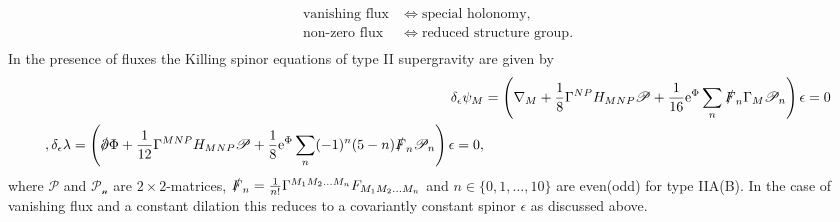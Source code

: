 \begin{equation*}
    \begin{aligned}
    \text{vanishing flux}&\Longleftrightarrow \text{special holonomy},\\
    \text{non-zero flux}&\Longleftrightarrow \text{reduced structure group}.\\
    \end{aligned}
\end{equation*}
In the presence of fluxes the Killing spinor equations of type II supergravity are given by \cite{Blumenhagen2013}
\begin{equation}\label{eq:KillingSpinorWithFluxGravitino}
\begin{aligned}
    \delta_\epsilon \psi_M &= \left(\nabla_M+\frac{1}{8}\Gamma^{NP}H_{MNP}\mathscr{P}+\frac{1}{16}\ee^\Phi\sum_{n}\slashed{F}_n\Gamma_M\mathscr{P}_n\right)\epsilon=0\\,

    \delta_\epsilon \lambda = \left(\slashed{\pd}\Phi+\frac{1}{12}\Gamma^{MNP}H_{MNP}\mathscr{P}+\frac{1}{8}\ee^\Phi\sum_{n}(-1)^n(5-n)\slashed{F}_n\mathscr{P}_n\right)\epsilon=0,
    \end{aligned}
\end{equation}
where $\mathscr{P}$ and $\mathscr{P_n}$ are $2\times 2$-matrices, $\slashed{F}_n=\frac{1}{n!}\Gamma^{M_1M_2\ldots M_n}F_{M_1M_2\ldots M_n}$ and $n\in\{0,1,\ldots,10\}$ are even(odd) for type IIA(B). In the case of vanishing flux and a constant dilation this reduces to a covariantly constant spinor $\epsilon$ as discussed above. 

